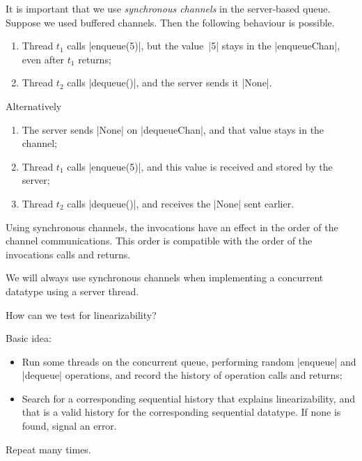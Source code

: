 

\begin{slide}

It is important that we use \emph{synchronous channels} in the server-based
queue.  Suppose we used buffered channels.  Then the following behaviour is
possible.
%
\begin{enumerate}
\item Thread $t_1$ calls |enqueue(5)|, but the value~|5| stays in the
  |enqueueChan|, even after $t_1$ returns;

\item Thread $t_2$ calls |dequeue()|, and the server sends it |None|.
\end{enumerate}

Alternatively
%
\begin{enumerate}
\item The server sends |None| on |dequeueChan|, and that value stays in the
  channel; 

\item Thread $t_1$ calls |enqueue(5)|, and this value is received and stored
  by the server; 

\item Thread $t_2$ calls |dequeue()|, and receives the |None| sent earlier.
\end{enumerate}
\end{slide}


\begin{slide}

Using synchronous channels, the invocations have an effect in the order of the
channel communications.  This order is compatible with the order of the
invocations calls and returns.

We will always use synchronous channels when implementing a concurrent
datatype using a server thread.   
\end{slide}



\begin{slide}

How can we test for linearizability?

Basic idea: 
%
\begin{itemize}
\item Run some threads on the concurrent queue, performing random |enqueue|
and |dequeue| operations, and record the history of operation calls and
returns;

\item Search for a corresponding sequential history that explains
linearizability, and that is a valid history for the corresponding sequential
datatype.  If none is found, signal an error.
\end{itemize}
%
Repeat many times.
\end{slide}

